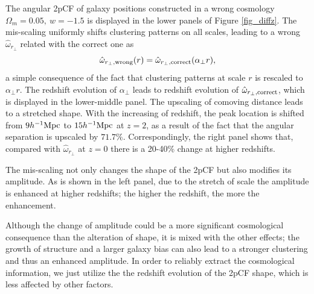 \documentclass[iop]{emulateapj}
\begin{document}
The angular 2pCF of galaxy positions constructed in a wrong cosmology $\Omega_m=0.05,\ w=-1.5$
is displayed in the lower panels of Figure \ref{fig_diffz}.
The mis-scaling uniformly shifts clustering patterns on all scales, 
leading to a wrong $\hat \omega_{r_\perp}$ 
related with the correct one as
\begin{equation}
 \hat \omega_{r_\perp,\rm wrong}(r) = \hat \omega_{r_\perp, \rm correct}(\alpha_{\perp} r),
\end{equation}
a simple consequence of the fact that clustering patterns at scale $r$ is rescaled to $\alpha_{\perp} r$.
The redshift evolution of $\alpha_{\perp}$ leads to redshift evolution of 
$\hat \omega_{r_\perp, \rm correct}$,
which is displayed in the lower-middle panel.
The upscaling of comoving distance leads to a stretched shape.
With the increasing of redshift,
the peak location is shifted from $9h^{-1} \rm Mpc$ to $15 h^{-1}\rm Mpc$ at $z=2$,
as a result of the fact that the angular separation is upscaled by $71.7\%$.
Correspondingly, the right panel shows that, 
compared with $\hat \omega_{r_\perp}$ at $z=0$ there is a 20-40\% change at higher redshifts.

The mis-scaling not only changes the shape of the 2pCF but also modifies its amplitude. %
As is shown in the left panel, due to the stretch of scale the amplitude is enhanced at higher redshifts;
the higher the redshift, the more the enhancement.%

Although the change of amplitude could be a more significant cosmological consequence 
than the alteration of shape,
it is mixed with the other effects; 
the growth of structure and a larger galaxy bias can also lead to a stronger clustering and thus an enhanced amplitude.
In order to reliably extract the cosmological information, 
we just utilize the the redshift evolution of the 2pCF shape, 
which is less affected by other factors.
\end{document}
